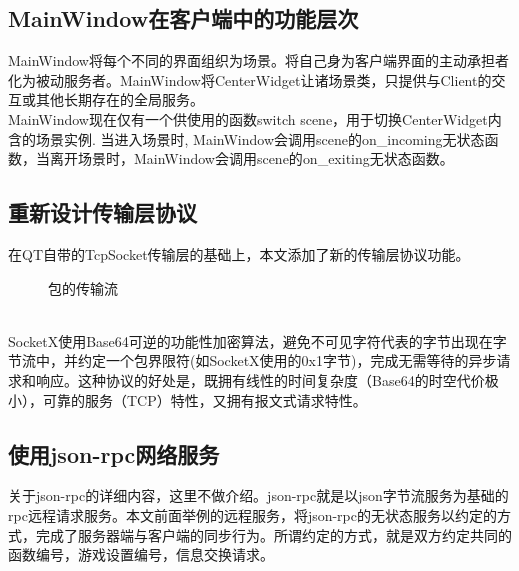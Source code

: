 \documentclass[UTF8]{ctexart}
\newcommand{\fira}[1]{{\firacode {}#1}}
\begin{document}
\subsection{MainWindow在客户端中的功能层次}
MainWindow将每个不同的界面组织为场景。将自己身为客户端界面的主动承担者化为被动服务者。MainWindow将CenterWidget让诸场景类，只提供与Client的交互或其他长期存在的全局服务。\\
\indent MainWindow现在仅有一个供使用的函数\fira{switch scene}，用于切换CenterWidget内含的场景实例.
\indent 当进入场景时, MainWindow会调用scene的\fira{on\_incoming}无状态函数，当离开场景时，MainWindow会调用scene的\fira{on\_exiting}无状态函数。
\subsection{重新设计传输层协议}
在QT自带的TcpSocket传输层的基础上，本文添加了新的传输层协议功能。\\
\begin{figure}[!h]
    \centering
    \caption{包的传输流}
\end{figure}\\
\indent SocketX使用Base64可逆的功能性加密算法，避免不可见字符代表的字节出现在字节流中，并约定一个包界限符(如SocketX使用的0x1字节)，完成无需等待的异步请求和响应。这种协议的好处是，既拥有线性的时间复杂度（Base64的时空代价极小），可靠的服务（TCP）特性，又拥有报文式请求特性。
\subsection{使用json-rpc网络服务}
关于json-rpc的详细内容，这里不做介绍。json-rpc就是以json字节流服务为基础的rpc远程请求服务。本文前面举例的远程服务，将json-rpc的无状态服务以约定的方式，完成了服务器端与客户端的同步行为。所谓约定的方式，就是双方约定共同的函数编号，游戏设置编号，信息交换请求。
\end{document}
